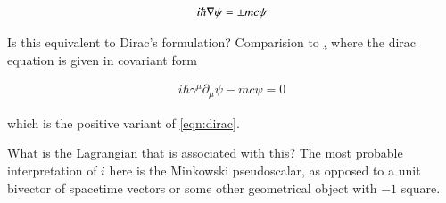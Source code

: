 \documentclass{article}
\begin{document}
\begin{align}\label{eqn:dirac}
i \hbar \nabla \psi = \pm m c \psi
\end{align}

Is this equivalent to Dirac's formulation?  Comparision to 
\href{http://en.wikipedia.org/wiki/Dirac_equation#Covariant_form_and_relativistic_invariance}, where the dirac equation is given in covariant
form

\begin{align*}
i \hbar \gamma^\mu \partial_\mu \psi - m c \psi = 0
\end{align*}

which is the positive variant of \ref{eqn:dirac}.

What is the Lagrangian that is associated with this?  The most probable interpretation of $i$ here is the Minkowski pseudoscalar, as opposed to
a unit bivector of spacetime vectors or some other geometrical object with $-1$ square.



\end{document}

